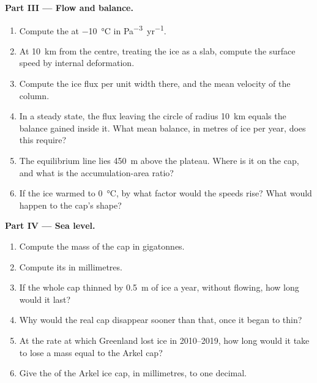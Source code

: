 \begin{problem}
\medskip\noindent\textbf{Part III --- Flow and balance.}
\begin{enumerate}[resume]
\item Compute the  at \qty{-10}{\celsius} in
  \unit{Pa^{-3}.yr^{-1}}.
\item At \qty{10}{km} from the centre, treating the ice as a slab, compute
  the surface speed by internal deformation.
\item Compute the ice flux per unit width there, and the mean velocity of
  the column.
\item In a steady state, the flux leaving the circle of radius
  \qty{10}{km} equals the balance gained inside it. What mean balance, in
  metres of ice per year, does this require?
\item The equilibrium line lies \qty{450}{m} above the plateau. Where is it
  on the cap, and what is the accumulation-area ratio?
\item If the ice warmed to \qty{0}{\celsius}, by what factor would the
  speeds rise? What would happen to the cap's shape?
\end{enumerate}

\medskip\noindent\textbf{Part IV --- Sea level.}
\begin{enumerate}[resume]
\item Compute the mass of the cap in gigatonnes.
\item Compute its  in millimetres.
\item If the whole cap thinned by \qty{0.5}{m} of ice a year, without
  flowing, how long would it last?
\item Why would the real cap disappear sooner than that, once it began to
  thin?
\item At the rate at which Greenland lost ice in 2010--2019, how long would
  it take to lose a mass equal to the Arkel cap?
\item Give the  of the Arkel ice cap, in millimetres,
  to one decimal.
\end{enumerate}
\end{problem}
